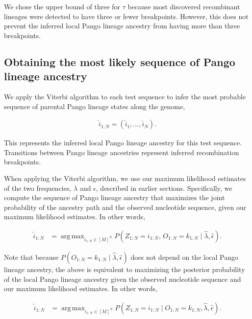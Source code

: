 \documentclass[11pt,oneside,letterpaper]{article}
\DeclareMathOperator*{\argmax}{arg\,max}
\begin{document}
We chose the upper bound of three for $\tau$ because most discovered recombinant lineages were detected to have three or fewer breakpoints. However, this does not prevent the inferred local Pango lineage ancestry from having more than three breakpoints. 

\subsection{Obtaining the most likely sequence of Pango lineage ancestry}\label{sec:Viterbi}

We apply the Viterbi algorithm \cite{rabiner_tutorial_1989} to each test sequence to infer the most probable sequence of parental Pango lineage states along the genome,

\begin{align*}
\hat{i}_{1:N} = (\hat{i}_1, \ldots, \hat{i}_N).
\end{align*}

This represents the inferred local Pango lineage ancestry for this test sequence. Transitions between Pango lineage ancestries represent inferred recombination breakpoints.

When applying the Viterbi algorithm, we use our maximum likelihood estimates of the two frequencies, $\lambda$ and $\epsilon$, described in earlier sections. Specifically, we compute the sequence of Pango lineage ancestry that maximizes the joint probability of the ancestry path and the observed nucleotide sequence, given our maximum likelihood estimates. In other words,

\begin{align*}
\hat{i}_{1:N} 
&= \argmax_{i_{1:N}\in [M]^N}
P(Z_{1:N}=i_{1:N},\, O_{1:N}=k_{1:N} \mid
\hat\lambda, \hat\epsilon).
\end{align*}

Note that because $P(O_{1:N}=k_{1:N} \mid
\hat\lambda, \hat\epsilon)$ does not depend on the local Pango lineage ancestry, the above is equivalent to maximizing the posterior probability of the local Pango lineage ancestry given the observed nucleotide sequence and our maximum likelihood estimates. In other words,

\begin{align*}
\hat{i}_{1:N} 
&= \argmax_{i_{1:N}\in [M]^N}
P(Z_{1:N}=i_{1:N} \mid O_{1:N}=k_{1:N},
\hat\lambda, \hat\epsilon).
\end{align*}


\end{document}
